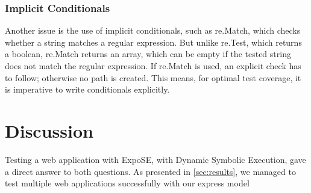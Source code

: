 \subsubsection{Implicit Conditionals}
Another issue is the use of implicit conditionals, such as re.Match, which checks whether a string matches a regular expression. But unlike re.Test, which returns a boolean, re.Match returns an array, which can be empty if the tested string does not match the regular expression. 
If re.Match is used, an explicit check has to follow; otherwise no path is created. 
This means, for optimal test coverage, it is imperative to write conditionals explicitly. 



\section{Discussion}
Testing a web application with ExpoSE, with Dynamic Symbolic Execution, gave a direct answer to both questions. As presented in \autoref{sec:results}, we managed to test multiple web applications successfully with our express model 
